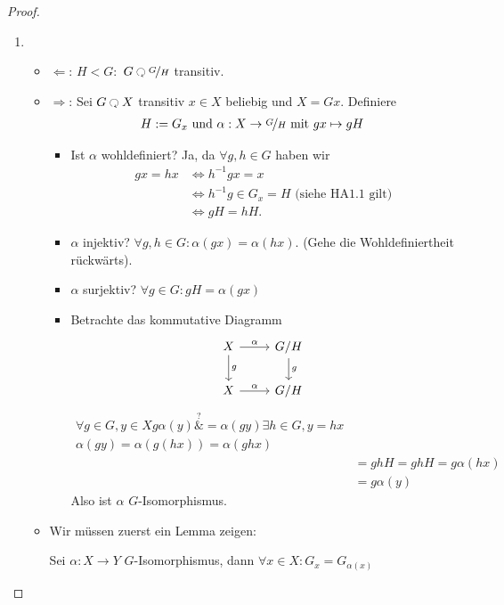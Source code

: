 \begin{proof}
	\begin{enumerate}
		\item 
		\begin{itemize}
			\item $\Leftarrow$: $H < G \colon$ $G \Circlearrowleft \lnkset{G}{H}$ transitiv.
			\item $\Rightarrow$: Sei $G \Circlearrowleft X$ transitiv $x \in X$ beliebig und $X = Gx$. Definiere
			\begin{align*}
				H:= G_x \text{ und } \alpha: X \to \lnkset{G}{H} \mit gx \mapsto gH
			\end{align*} 
			\begin{itemize}
				\item Ist $\alpha$ wohldefiniert? Ja, da $\forall g,h \in G$ haben wir 
				\begin{align*}
				gx = hx &\Leftrightarrow h^{-1}g x = x\\
				&\Leftrightarrow h^{-1}g \in G_x = H \text{ (siehe HA1.1 gilt)}\\
				&\Leftrightarrow gH = hH.
				\end{align*}
				\item $\alpha$ injektiv? $\forall g,h \in G\colon \alpha(gx) = \alpha(hx)$. (Gehe die Wohldefiniertheit rückwärts).
				\item $\alpha$ surjektiv? $\forall g \in G \colon gH = \alpha(gx)$
				\item Betrachte das kommutative Diagramm
				\[
					\begin{tikzcd}
					X \arrow[r, "\alpha"] \arrow[d, "g"] & G/H \arrow[d, "g"] \\
					X \arrow[r, "\alpha"]                & G/H               
					\end{tikzcd}
				\]
				\begin{align*}
					\forall g\in G, y \in X g \alpha(y) \overset{?}&{=} \alpha(gy)\exists h \in G, y = hx\\
					\alpha(gy) = \alpha(g(hx)) = \alpha(ghx)\\
					&=ghH = ghH = g\alpha(hx)\\
					&= g \alpha(y)
				\end{align*}
				Also ist $\alpha$ $G$-Isomorphismus.
			\end{itemize}
			\item Wir müssen zuerst ein Lemma zeigen: 
			\begin{lemma}
				Sei $\alpha\colon X \to Y$ $G$-Isomorphismus, dann $\forall x \in X\colon G_x = G_{\alpha(x)}$

\end{lemma}
\end{itemize}
\end{enumerate}
\end{proof}
